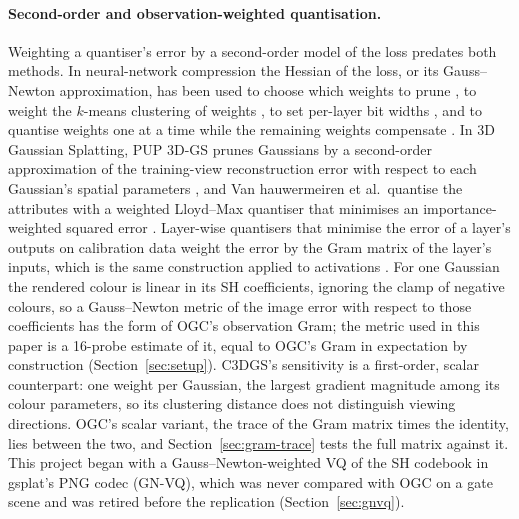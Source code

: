 \paragraph{Second-order and observation-weighted quantisation.}
Weighting a quantiser's error by a second-order model of the loss predates both methods.
In neural-network compression the Hessian of the loss, or its Gauss--Newton approximation, has been used to choose which weights to prune \citep{lecun1989optimal,hassibi1992second}, to weight the $k$-means clustering of weights \citep{choi2017towards}, to set per-layer bit widths \citep{dong2019hawq}, and to quantise weights one at a time while the remaining weights compensate \citep{frantar2022optimal,frantar2023optq}.
In 3D Gaussian Splatting, PUP 3D-GS prunes Gaussians by a second-order approximation of the training-view reconstruction error with respect to each Gaussian's spatial parameters \citep{hanson2025pup}, and Van hauwermeiren et al.\ quantise the attributes with a weighted Lloyd--Max quantiser that minimises an importance-weighted squared error \citep{vanhauwermeiren2026nonuniform}. %
Layer-wise quantisers that minimise the error of a layer's outputs on calibration data weight the error by the Gram matrix of the layer's inputs, which is the same construction applied to activations \citep{nagel2020up,frantar2023optq}.
For one Gaussian the rendered colour is linear in its SH coefficients, ignoring the clamp of negative colours, so a Gauss--Newton metric of the image error with respect to those coefficients has the form of OGC's observation Gram; the metric used in this paper is a 16-probe estimate of it, equal to OGC's Gram in expectation by construction (Section~\ref{sec:setup}). %
C3DGS's sensitivity is a first-order, scalar counterpart: one weight per Gaussian, the largest gradient magnitude among its colour parameters, so its clustering distance does not distinguish viewing directions. %
OGC's scalar variant, the trace of the Gram matrix times the identity, lies between the two, and Section~\ref{sec:gram-trace} tests the full matrix against it. %
This project began with a Gauss--Newton-weighted VQ of the SH codebook in gsplat's PNG codec (GN-VQ), which was never compared with OGC on a gate scene and was retired before the replication (Section~\ref{sec:gnvq}). %

